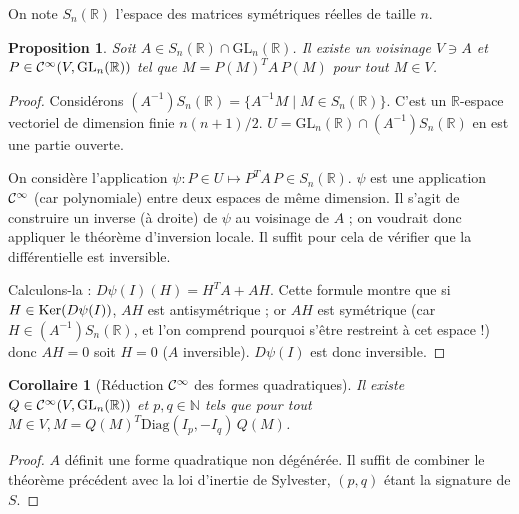 \documentclass[a4paper, 11pt]{article}
\def\N{\mathbb{N}}
\def\R{\mathbb{R}}
\def\Cf{{\cal{C}}}
\def\Ker{\textnormal{Ker}}
\def\GL{\mathrm{GL}}
\def\Diag{\mathrm{Diag}}
\newtheorem*{proposition}{Proposition}
\newtheorem*{corollary}{Corollaire}
\begin{document}
On note $S_n(\R)$ l'espace des matrices symétriques réelles de taille $n$.

\begin{proposition}
  Soit $A \in S_n(\R) \cap \GL_n(\R)$. Il existe un voisinage $V \ni A$ et $P
  \in \Cf^\infty(V, \GL_n(\R))$ tel que $M = P(M)^T A \, P(M)$ pour
  tout $M \in V$.
\end{proposition}

\begin{proof}
  Considérons $(A^{-1})S_n(\R) = \{A^{-1}M \mid M \in S_n(\R)\}$. C'est un
  $\R$-espace vectoriel de dimension finie $n(n+1)/2$. $U = \GL_n(\R) \cap
  (A^{-1})S_n(\R)$ en est une partie ouverte.
  
  On considère l'application $\psi : P \in U \mapsto P^T A \, P \in S_n(\R)$.
  $\psi$ est une application $\Cf^\infty$ (car polynomiale) entre deux espaces
  de même dimension. Il s'agit de construire un inverse (à droite) de $\psi$ au
  voisinage de $A$ ; on voudrait donc appliquer le théorème d'inversion locale.
  Il suffit pour cela de vérifier que la différentielle est inversible.

  Calculons-la : $D\psi(I)(H) = H^TA + AH$. Cette formule montre que si $H \in
  \Ker(D\psi(I))$, $AH$ est antisymétrique ; or $AH$ est symétrique (car $H \in
  (A^{-1})S_n(\R)$, et l'on comprend pourquoi s'être restreint à cet espace !)
  donc $AH = 0$ soit $H = 0$ ($A$ inversible). $D\psi(I)$ est donc inversible.
\end{proof}

\begin{corollary}[Réduction $\Cf^\infty$ des formes quadratiques]
  Il existe $Q \in \Cf^\infty(V, \GL_n(\R))$ et $p, q \in \N$ tels que pour tout
  $M \in V, M = Q(M)^T \Diag(I_p, -I_q)\, Q(M)$.
\end{corollary}
\begin{proof}
  $A$ définit une forme quadratique non dégénérée. Il suffit de combiner le
  théorème précédent avec la loi d'inertie de Sylvester, $(p,q)$ étant la
  signature de $S$.
\end{proof}
\end{document}
